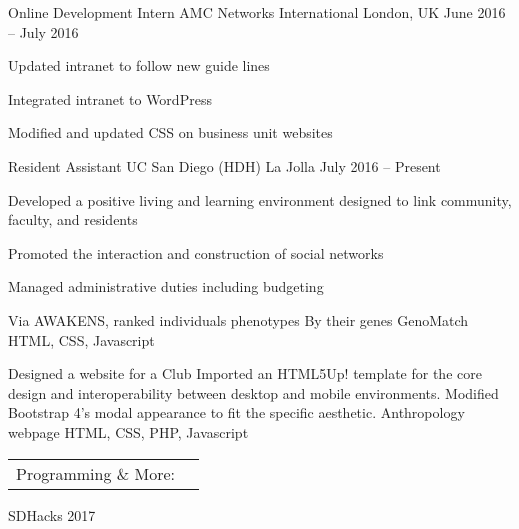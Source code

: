 \documentclass[]{awesome-cv}
\begin{document}
\vspace{-2mm}
\begin{cventries}
	\cventry
	{Online Development Intern}
	{AMC Networks International}
	{London, UK}
	{June 2016 – July 2016}
	{\begin{cvitems}
		\item {Updated intranet to follow new guide lines}
		\item {Integrated intranet to WordPress}
		\item {Modified and updated CSS on business unit websites}
		\end{cvitems}}
	\cventry
	{Resident Assistant}
	{UC San Diego (HDH)}
	{La Jolla}
	{July 2016 – Present}
	{\begin{cvitems}
		\item {Developed a positive living and learning environment designed to link community, faculty, and residents}
		\item {Promoted the interaction and construction of social networks}
		\item {Managed administrative duties including budgeting}
		\end{cvitems}}
\end{cventries}
\begin{cventries}
	\cventry
	{Via AWAKENS, ranked individuals phenotypes By their genes}
	{GenoMatch}
	{HTML, CSS, Javascript}
	{}
	{}
	
	\vspace{-5mm}
	\cventry
	{Designed a website for a Club Imported an HTML5Up! template for the core design and interoperability between desktop and mobile environments. Modified Bootstrap 4’s modal appearance to fit the specific aesthetic.}
	{Anthropology webpage}
	{HTML, CSS, PHP, Javascript}
	{}
	{}
	
	\vspace{-5mm}
\end{cventries}
\begin{cventries}
	\cventry
	{}
	{\def\arraystretch{1.15}{\begin{tabular}{ l l }
		Programming \& More:  & {\skill{ Java, C, HTML, CSS, JavaScript, \LaTeX, MySQL, Git, Unix Shell, Ubuntu}} \\
		\end{tabular}}}
	{}
	{}
	{}
\end{cventries}

\vspace{-7mm}
\begin{cvhonors}
	\cvhonor
	{SDHacks 2017}
	{}
	{}
	{}
\end{cvhonors}
\ 
\end{document}
